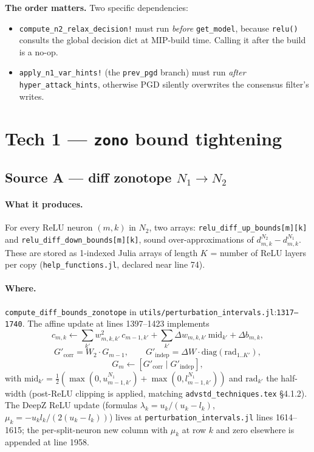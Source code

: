 \documentclass[11pt]{article}
\newcommand{\src}[1]{\texttt{\small #1}}
\newcommand{\fileline}[2]{\src{#1}:\src{#2}}
\begin{document}
\noindent\textbf{The order matters.} Two specific dependencies:

\begin{itemize}[noitemsep, leftmargin=2em]
  \item \src{compute\_n2\_relax\_decision!} must run \emph{before}
    \src{get\_model}, because \src{relu()} consults the global
    decision dict at MIP-build time. Calling it after the build is a
    no-op.
  \item \src{apply\_n1\_var\_hints!} (the \texttt{prev\_pgd} branch)
    must run \emph{after} \src{hyper\_attack\_hints}, otherwise PGD
    silently overwrites the consensus filter's writes.
\end{itemize}

\section{Tech 1 --- \texttt{zono} bound tightening}
\label{sec:zono}

\subsection{Source A --- diff zonotope $N_1 \to N_2$}

\paragraph{What it produces.}
For every ReLU neuron $(m, k)$ in $N_2$, two arrays:
\src{relu\_diff\_up\_bounds[m][k]} and
\src{relu\_diff\_down\_bounds[m][k]}, sound over-approximations of
$d^{N_2}_{m,k} - d^{N_1}_{m,k}$. These are stored as 1-indexed Julia
arrays of length $K$ = number of ReLU layers per copy
(\src{help\_functions.jl}, declared near line 74).

\paragraph{Where.}
\src{compute\_diff\_bounds\_zonotope} in
\fileline{utils/perturbation\_intervals.jl}{1317--1740}. The affine
update at lines 1397--1423 implements
\[
  c_{m,k} \leftarrow \sum_{k'} w^2_{m,k,k'}\, c_{m-1,k'}
    + \sum_{k'} \Delta w_{m,k,k'}\, \mathrm{mid}_{k'} + \Delta b_{m,k},
\]
\[
  G'_{\mathrm{corr}} = W_2 \cdot G_{m-1}, \qquad
  G'_{\mathrm{indep}} = \Delta W \cdot \mathrm{diag}(\mathrm{rad}_{1..K'}),
\]
\[
  G_m \leftarrow [G'_{\mathrm{corr}} \;\big|\; G'_{\mathrm{indep}}],
\]
with $\mathrm{mid}_{k'} = \tfrac12(\max(0, u^{N_1}_{m{-}1,k'}) +
\max(0, l^{N_1}_{m{-}1,k'}))$ and $\mathrm{rad}_{k'}$ the
half-width (post-ReLU clipping is applied, matching
\texttt{advstd\_techniques.tex} \S 4.1.2). The DeepZ ReLU update
(formulas $\lambda_k = u_k/(u_k - l_k)$, $\mu_k = -u_k l_k /
(2(u_k - l_k))$) lives at \src{perturbation\_intervals.jl} lines
1614--1615; the per-split-neuron new column with $\mu_k$ at row $k$
and zero elsewhere is appended at line 1958.
\end{document}
